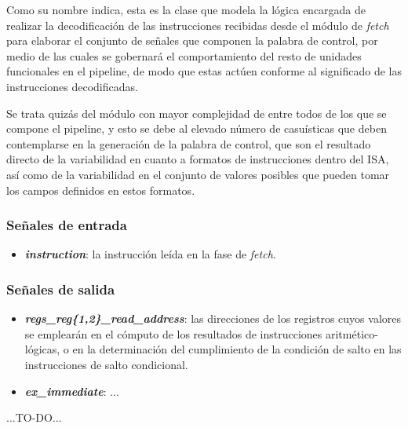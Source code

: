 Como su nombre indica, esta es la clase que modela la lógica encargada de realizar la decodificación de las instrucciones recibidas desde el módulo de \textit{fetch} para elaborar el conjunto de señales que componen la palabra de control, por medio de las cuales se gobernará el comportamiento del resto de unidades funcionales en el pipeline, de modo que estas actúen conforme al significado de las instrucciones decodificadas.

Se trata quizás del módulo con mayor complejidad de entre todos de los que se compone el pipeline, y esto se debe al elevado número de casuísticas que deben contemplarse en la generación de la palabra de control, que son el resultado directo de la variabilidad en cuanto a formatos de instrucciones dentro del ISA, así como de la variabilidad en el conjunto de valores posibles que pueden tomar los campos definidos en estos formatos.

\subsubsection{Señales de entrada}

\begin{itemize}
  \item \textbf{\textit{instruction}}: la instrucción leída en la fase de \textit{fetch}.
\end{itemize}

\subsubsection{Señales de salida}

\begin{itemize}
  \item \textbf{\textit{regs\_reg\{1,2\}\_read\_address}}: las direcciones de los registros cuyos valores se emplearán en el cómputo de los resultados de instrucciones aritmético-lógicas, o en la determinación del cumplimiento de la condición de salto en las instrucciones de salto condicional.
  \vspace{-0.2cm}
  \item \textbf{\textit{ex\_immediate}}: ...
\end{itemize}

...TO-DO...